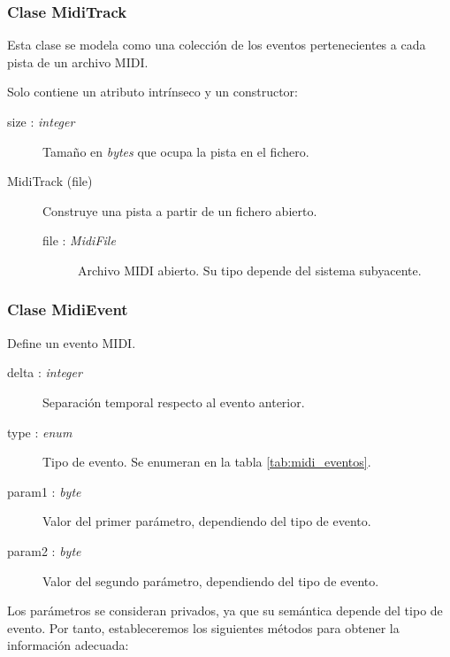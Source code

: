 \subsubsection{Clase MidiTrack}

Esta clase se modela como una colección de los eventos pertenecientes a cada pista de un archivo \acrshort{MIDI}.

Solo contiene un atributo intrínseco y un constructor:

\begin{description}
	\item[size : \textit{integer}] Tamaño en \textit{bytes} que ocupa la pista en el fichero.
\end{description}

\begin{description}
	\item[MidiTrack (file)]
	Construye una pista a partir de un fichero abierto.
	
	\begin{description}
		\item[file : \textit{MidiFile}] Archivo \acrshort{MIDI} abierto. Su tipo depende del sistema subyacente.
	\end{description}
\end{description}

\subsubsection{Clase MidiEvent}

Define un evento \acrshort{MIDI}.

\begin{description}
	\item[delta : \textit{integer}] Separación temporal respecto al evento anterior.
	\item[type : \textit{enum}] Tipo de evento. Se enumeran en la tabla \ref{tab:midi_eventos}.
	\item[param1 : \textit{byte}] Valor del primer parámetro, dependiendo del tipo de evento.
	\item[param2 : \textit{byte}] Valor del segundo parámetro, dependiendo del tipo de evento.
\end{description}

Los parámetros se consideran privados, ya que su semántica depende del tipo de evento. Por tanto, estableceremos los siguientes métodos para obtener la información adecuada:

